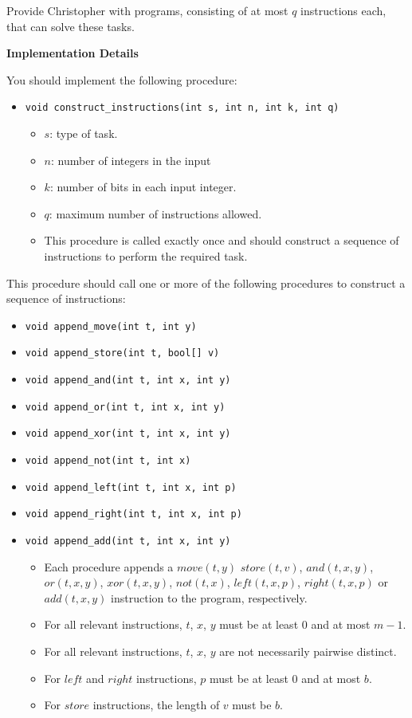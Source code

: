 Provide Christopher with programs, consisting of at most $q$ instructions each, that can solve these
tasks.

\textbf{Implementation Details}

You should implement the following procedure:
\begin{itemize}
\item \texttt{void construct\_instructions(int s, int n, int k, int q)}
\begin{itemize}
\item $s$: type of task.
\item $n$: number of integers in the input
\item $k$: number of bits in each input integer.
\item $q$: maximum number of instructions allowed.
\item This procedure is called exactly once and should construct a sequence of instructions to perform
the required task.
\end{itemize}
\end{itemize}

This procedure should call one or more of the following procedures to construct a sequence of
instructions:

\begin{itemize}
\item \texttt{void append\_move(int t, int y)}
\item \texttt{void append\_store(int t, bool[] v)}
\item \texttt{void append\_and(int t, int x, int y)}
\item \texttt{void append\_or(int t, int x, int y)}
\item \texttt{void append\_xor(int t, int x, int y)}
\item \texttt{void append\_not(int t, int x)}
\item \texttt{void append\_left(int t, int x, int p)}
\item \texttt{void append\_right(int t, int x, int p)}
\item \texttt{void append\_add(int t, int x, int y)}
\begin{itemize}
\item Each procedure appends a $move(t,y)$ $store(t,v)$, $and(t,x,y)$, $or(t,x,y)$, $xor(t,x,y)$, $not(t,x)$, $left(t,x,p)$, $right(t,x,p)$ or $add(t,x,y)$ instruction to the program,
respectively.
\item For all relevant instructions, $t$, $x$, $y$ must be at least $0$ and at most $m-1$.
\item For all relevant instructions, $t$, $x$, $y$ are not necessarily pairwise distinct.
\item For $left$ and $right$ instructions, $p$ must be at least $0$ and at most $b$.
\item For $store$ instructions, the length of $v$ must be $b$.
\end{itemize}
\end{itemize}

